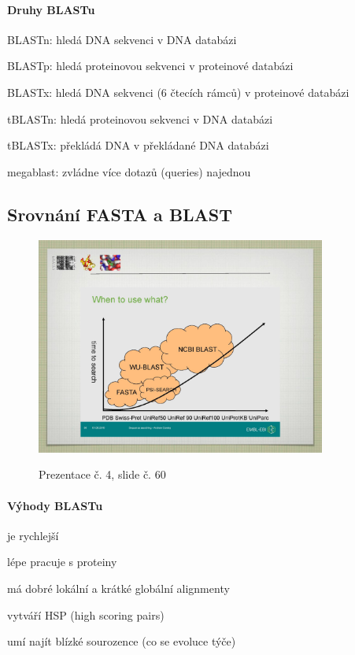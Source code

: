 \documentclass[DIV=8]{scrreprt}
\begin{document}
\paragraph{Druhy BLASTu}
\begin{myItemize}[nosep]
    \item BLASTn: hledá DNA sekvenci v DNA databázi
    \item BLASTp: hledá proteinovou sekvenci v proteinové databázi
    \item BLASTx: hledá DNA sekvenci (6 čtecích rámců) v proteinové databázi
    \item tBLASTn: hledá proteinovou sekvenci v DNA databázi
    \item tBLASTx: překládá DNA v překládané DNA databázi
    \item megablast: zvládne více dotazů (queries) najednou
\end{myItemize}



\subsection{Srovnání FASTA a BLAST} \label{Srovnání FASTA a BLAST}


\begin{figure}
    \caption{Prezentace č. 4, slide č. 60}
    \includegraphics[width=0.85\textwidth]{slides-4/slide-60.jpg}
    \centering
    \label{slides-4-slide-60}
\end{figure}

\paragraph{Výhody BLASTu}
\begin{myItemize}[nosep]
    \item je rychlejší
    \item lépe pracuje s proteiny
    \item má dobré lokální a krátké globální alignmenty
    \item vytváří HSP (high scoring pairs)
    \item umí najít blízké sourozence (co se evoluce týče)
\end{myItemize}
\end{document}
